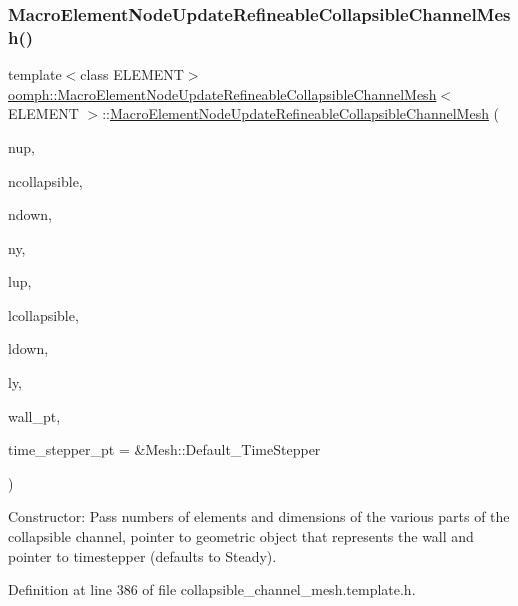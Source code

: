 \subsubsection{\texorpdfstring{Macro\+Element\+Node\+Update\+Refineable\+Collapsible\+Channel\+Mesh()}{MacroElementNodeUpdateRefineableCollapsibleChannelMesh()}}
{\footnotesize\ttfamily template$<$class E\+L\+E\+M\+E\+NT$>$ \\
\hyperlink{classoomph_1_1MacroElementNodeUpdateRefineableCollapsibleChannelMesh}{oomph\+::\+Macro\+Element\+Node\+Update\+Refineable\+Collapsible\+Channel\+Mesh}$<$ E\+L\+E\+M\+E\+NT $>$\+::\hyperlink{classoomph_1_1MacroElementNodeUpdateRefineableCollapsibleChannelMesh}{Macro\+Element\+Node\+Update\+Refineable\+Collapsible\+Channel\+Mesh} (\begin{DoxyParamCaption}\item[{const unsigned \&}]{nup,  }\item[{const unsigned \&}]{ncollapsible,  }\item[{const unsigned \&}]{ndown,  }\item[{const unsigned \&}]{ny,  }\item[{const double \&}]{lup,  }\item[{const double \&}]{lcollapsible,  }\item[{const double \&}]{ldown,  }\item[{const double \&}]{ly,  }\item[{Geom\+Object $\ast$}]{wall\+\_\+pt,  }\item[{Time\+Stepper $\ast$}]{time\+\_\+stepper\+\_\+pt = {\ttfamily \&Mesh\+:\+:Default\+\_\+TimeStepper} }\end{DoxyParamCaption})\hspace{0.3cm}{\ttfamily [inline]}}



Constructor\+: Pass numbers of elements and dimensions of the various parts of the collapsible channel, pointer to geometric object that represents the wall and pointer to timestepper (defaults to Steady). 



Definition at line 386 of file collapsible\+\_\+channel\+\_\+mesh.\+template.\+h.

\mbox{\label{classoomph_1_1MacroElementNodeUpdateRefineableCollapsibleChannelMesh_a5f0960e124d26e10cc70e2143744a07f}} 
